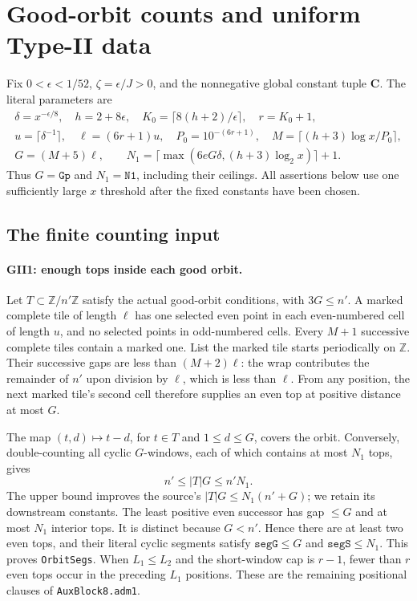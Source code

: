 \section{Good-orbit counts and uniform Type-II data}
\label{sec:type-two-family}


Fix $0<\epsilon<1/52$, $\zeta=\epsilon/J>0$, and the nonnegative global
constant tuple $\mathbf C$. The literal parameters are
\[
\begin{gathered}
 \delta=x^{-\epsilon/8},\quad h=2+8\epsilon,\quad
 K_0=\lceil8(h+2)/\epsilon\rceil,\quad r=K_0+1,\\
 u=\lceil\delta^{-1}\rceil,\quad \ell=(6r+1)u,\quad
 P_0=10^{-(6r+1)},\quad M=\lceil(h+3)\log x/P_0\rceil,\\
 G=(M+5)\ell,\qquad
 N_1=\lceil\max(6eG\delta,(h+3)\log_2x)\rceil+1.
\end{gathered}\tag{GII.1}
\]
Thus $G=\texttt{Gp}$ and $N_1=\texttt{N1}$, including their ceilings.
All assertions below use one sufficiently large $x$ threshold after the
fixed constants have been chosen.

\subsection{The finite counting input}

\paragraph{GII1: enough tops inside each good orbit.}
Let $T\subset\mathbb Z/n'\mathbb Z$ satisfy the actual good-orbit
conditions, with $3G\le n'$. A marked complete tile of length $\ell$
has one selected even point in each even-numbered cell of length $u$,
and no selected points in odd-numbered cells. Every $M+1$ successive
complete tiles contain a marked one. List the marked tile starts
periodically on $\mathbb Z$. Their successive gaps are less than
$(M+2)\ell$: the wrap contributes the remainder of $n'$ upon division
by $\ell$, which is less than $\ell$. From any position, the next
marked tile's second cell therefore supplies an even top at positive
distance at most $G$.

The map $(t,d)\mapsto t-d$, for $t\in T$ and $1\le d\le G$,
covers the orbit. Conversely, double-counting all cyclic $G$-windows,
each of which contains at most $N_1$ tops, gives
\[
 n'\le |T|G\le n'N_1.\tag{GII.2}
\]
The upper bound improves the source's $|T|G\le N_1(n'+G)$; we retain
its downstream constants. The least positive even successor has gap
$\le G$ and at most $N_1$ interior tops. It is distinct because $G<n'$.
Hence there are at least two even tops, and their literal cyclic
segments satisfy $\texttt{segG}\le G$ and $\texttt{segS}\le N_1$.
This proves \texttt{OrbitSegs}. When $L_1\le L_2$ and the short-window
cap is $r-1$, fewer than $r$ even tops occur in the preceding $L_1$
positions. These are the remaining positional clauses of
\texttt{AuxBlock8.adm1}.

